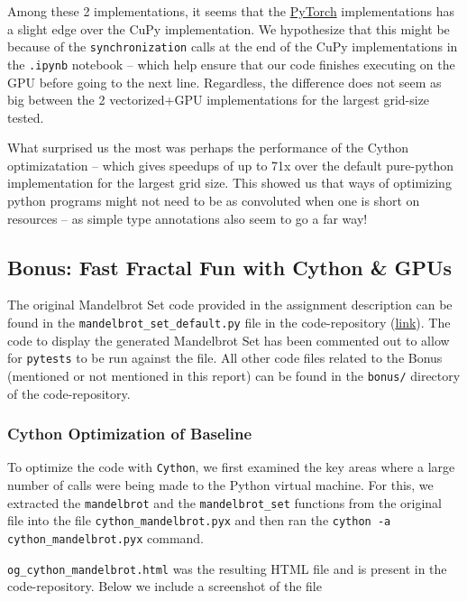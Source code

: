 \documentclass[a4paper,12pt]{article}
\begin{document}
Among these 2 implementations, it seems that the \underline{PyTorch} implementations has a slight edge over the CuPy implementation. We hypothesize that this might be because of the \verb|synchronization| calls at the end of the CuPy implementations in the \verb|.ipynb| notebook -- which help ensure that our code finishes executing on the GPU before going to the next line. Regardless, the difference does not seem as big between the 2 vectorized+GPU implementations for the largest grid-size tested. 

What surprised us the most was perhaps the performance of the Cython optimizatation -- which gives speedups of up to 71x over the default pure-python implementation for the largest grid size. This showed us that ways of optimizing python programs might not need to be as convoluted when one is short on resources -- as simple type annotations also seem to go a far way! 

\subsection{Bonus: Fast Fractal Fun with Cython \& GPUs}
The original Mandelbrot Set code provided in the assignment description can be found in the \verb|mandelbrot_set_default.py| file in the code-repository (\href{https://github.com/paulmyr/DD2358-HPC25/blob/master/03_compgpu/bonus/mandelbrot_set_default.py}{link}). The code to display the generated Mandelbrot Set has been commented out to allow for \verb|pytests| to be run against the file. All other code files related to the Bonus (mentioned or not mentioned in this report) can be found in the \verb|bonus/| directory of the code-repository.

\subsubsection{Cython Optimization of Baseline}
To optimize the code with \verb|Cython|, we first examined the key areas where a large number of calls were being made to the Python virtual machine. For this, we extracted the \verb|mandelbrot| and the \verb|mandelbrot_set| functions from the original file into the file \verb|cython_mandelbrot.pyx| and then ran the \verb|cython -a cython_mandelbrot.pyx| command. 

\verb|og_cython_mandelbrot.html| was the resulting HTML file and is present in the code-repository. Below we include a screenshot of the file
\end{document}
